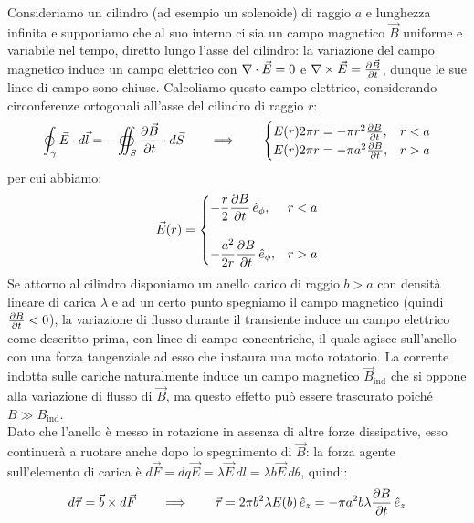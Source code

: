 \documentclass[]{article}
\begin{document}
Consideriamo un cilindro (ad esempio un solenoide) di raggio $ a $ e lunghezza infinita e supponiamo che al suo interno ci sia un campo magnetico $ \vec{B} $ uniforme e variabile nel tempo, diretto lungo l'asse del cilindro: la variazione del campo magnetico induce un campo elettrico con $ \nabla\cdot\vec{E} = 0 $ e $ \nabla\times\vec{E} = \frac{\partial\vec{B}}{\partial t} $, dunque le sue linee di campo sono chiuse. Calcoliamo questo campo elettrico, considerando circonferenze ortogonali all'asse del cilindro di raggio $ r $:
\begin{equation}
	\oint_{\gamma} \vec{E}\cdot d\vec{l} = - \oiint_{S} \frac{\partial\vec{B}}{\partial t}\cdot d\vec{S} \qquad\Longrightarrow\qquad
	\begin{cases}
		E(r) 2\pi r = - \pi r^2 \frac{\partial B}{\partial t} , & r < a \\
		
		E(r) 2\pi r = - \pi a^2 \frac{\partial B}{\partial t} , & r > a
	\end{cases}
	\label{eq:35}
\end{equation}
per cui abbiamo:
\begin{equation}
	\vec{E}(r) = 
	\begin{cases}
		-\displaystyle\frac{r}{2} \displaystyle\frac{\partial B}{\partial t} \,\hat{e}_{\phi} , & r < a \\
		\\ 
		-\displaystyle\frac{a^2}{2r} \displaystyle\frac{\partial B}{\partial t} \,\hat{e}_{\phi} , & r > a
	\end{cases}
	\label{eq:36}
\end{equation}
%
Se attorno al cilindro disponiamo un anello carico di raggio $ b > a $ con densità lineare di carica $ \lambda $ e ad un certo punto spegniamo il campo magnetico (quindi $ \frac{\partial B}{\partial t} < 0 $), la variazione di flusso durante il transiente induce un campo elettrico come descritto prima, con linee di campo concentriche, il quale agisce sull'anello con una forza tangenziale ad esso che instaura una moto rotatorio. La corrente indotta sulle cariche naturalmente induce un campo magnetico $ \vec{B}_{\text{ind}} $ che si oppone alla variazione di flusso di $ \vec{B} $, ma questo effetto può essere trascurato poiché $ B \gg B_{\text{ind}} $. \\ 
Dato che l'anello è messo in rotazione in assenza di altre forze dissipative, esso continuerà a ruotare anche dopo lo spegnimento di $ \vec{B} $: la forza agente sull'elemento di carica è $ d\vec{F} = dq\vec{E} = \lambda \vec{E}\,dl = \lambda b \vec{E} \,d\theta $, quindi:
\begin{equation}
	d\vec{\tau} = \vec{b}\times d\vec{F} \qquad\Longrightarrow\qquad \vec{\tau} = 2\pi b^2 \lambda E(b) \,\hat{e}_z = -\pi a^2 b \lambda \frac{\partial B}{\partial t} \,\hat{e}_z
	\label{eq:37}
\end{equation}
\end{document}
